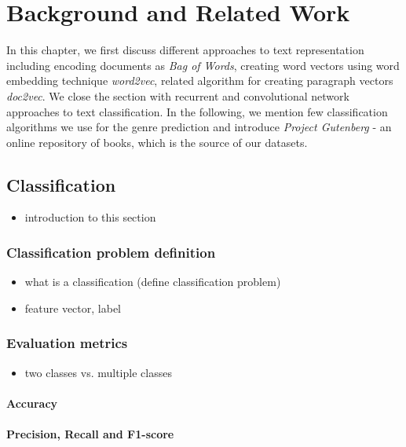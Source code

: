 \chapter{Background and Related Work}
In this chapter, we first discuss different approaches to text representation including encoding documents as \textit{Bag of Words}, creating word vectors using word embedding technique \textit{word2vec}, related algorithm for creating paragraph vectors \textit{doc2vec}. We close the section with recurrent and convolutional network approaches to text classification. In the following, we mention few classification algorithms we use for the genre prediction and introduce \textit{Project Gutenberg} - an online repository of books, which is the source of our datasets.


\section{Classification}
\label{classification_algorithms}

\begin{itemize}
    \item introduction to this section
\end{itemize}

\subsection{Classification problem definition}
\begin{itemize}
    \item what is a classification (define classification problem)
    \item feature vector, label
\end{itemize}

\subsection{Evaluation metrics}
\begin{itemize}
    \item two classes vs. multiple classes
\end{itemize}

\subsubsection{Accuracy}
\smallskip
\subsubsection{Precision, Recall and F1-score}
\smallskip


